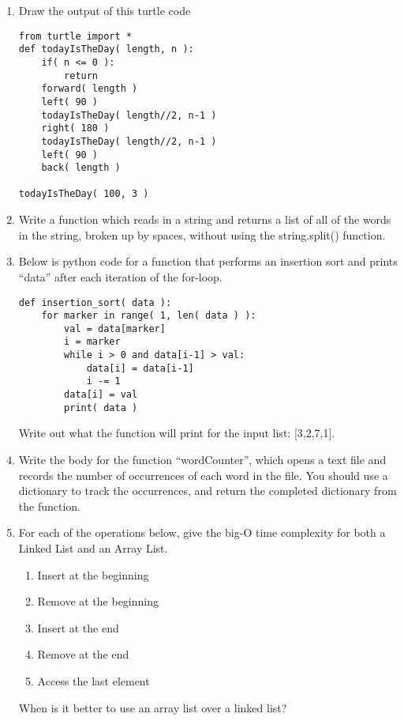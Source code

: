 \documentclass[11pt]{article}
\begin{document}
\begin{enumerate}
    \item Draw the output of this turtle code
        \begin{verbatim}
from turtle import *
def todayIsTheDay( length, n ):
    if( n <= 0 ):
        return
    forward( length )
    left( 90 )
    todayIsTheDay( length//2, n-1 )
    right( 180 )
    todayIsTheDay( length//2, n-1 )
    left( 90 )
    back( length )

todayIsTheDay( 100, 3 )
        \end{verbatim}

        \pagebreak
    
    \item Write a function which reads in a string and returns a list of all of
    the words in the string, broken up by spaces, without using the
    string.split() function.
        \vspace{5in}

    \item Below is python code for a function that performs an insertion sort
    and prints ``data'' after each iteration of the for-loop.
\begin{verbatim}
def insertion_sort( data ):
    for marker in range( 1, len( data ) ):
        val = data[marker]
        i = marker
        while i > 0 and data[i-1] > val:
            data[i] = data[i-1]
            i -= 1
        data[i] = val
        print( data )
\end{verbatim}
        Write out what the function will print for the input list: [3,2,7,1].
        \pagebreak

    \item Write the body for the function ``wordCounter'', which opens a text
    file and records the number of occurrences of each word in the file. You
    should use a dictionary to track the occurrences, and return the completed
    dictionary from the function.
        \vspace{3.5in}

    \item For each of the operations below, give the big-O time complexity for
    both a Linked List and an Array List.
        \begin{enumerate}
            \item Insert at the beginning\vspace{0.2in}
            \item Remove at the beginning\vspace{0.2in}
            \item Insert at the end\vspace{0.2in}
            \item Remove at the end\vspace{0.2in}
            \item Access the last element\vspace{0.2in}
        \end{enumerate}
    When is it better to use an array list over a linked list?
\end{enumerate}
\end{document}
